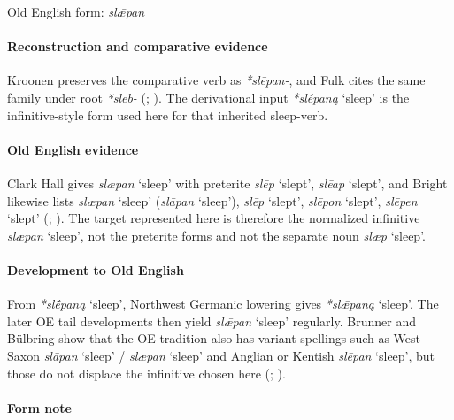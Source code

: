 \documentclass[
  british,
  a4paper,
]{article}
\providecommand{\Recon}[1]{\emph{*#1}}
\begin{document}
Old English form: \emph{slǣpan}

\paragraph{Reconstruction and comparative
evidence}\label{reconstruction-and-comparative-evidence-50}

Kroonen preserves the comparative verb as \emph{*slēpan-}, and Fulk
cites the same family under root \emph{*slēb-}
(; ). The derivational input \Recon{slḗpaną} `sleep' is the
infinitive-style form used here for that inherited sleep-verb.

\paragraph{Old English evidence}\label{old-english-evidence-50}

Clark Hall gives {\emph{slæpan}} `sleep' with preterite \emph{slēp}
`slept', \emph{slēap} `slept', and Bright likewise lists {\emph{slæpan}}
`sleep' ({\emph{slāpan}} `sleep'), \emph{slēp} `slept', \emph{slēpon}
`slept', \emph{slēpen} `slept' (; ). The
target represented here is therefore the normalized infinitive
\emph{slǣpan} `sleep', not the preterite forms and not the separate noun
\emph{slǣp} `sleep'.

\paragraph{Development to Old
English}\label{development-to-old-english-50}

From \Recon{slḗpaną} `sleep', Northwest Germanic lowering gives
\Recon{slǣpaną} `sleep'. The later OE tail developments then yield
{\emph{slǣpan}} `sleep' regularly. Brunner and Bülbring show that the OE
tradition also has variant spellings such as West Saxon {\emph{slāpan}}
`sleep' / {\emph{slæpan}} `sleep' and Anglian or Kentish {\emph{slēpan}}
`sleep', but those do not displace the infinitive chosen here
(;
).

\paragraph{Form note}\label{form-note-17}
\end{document}
